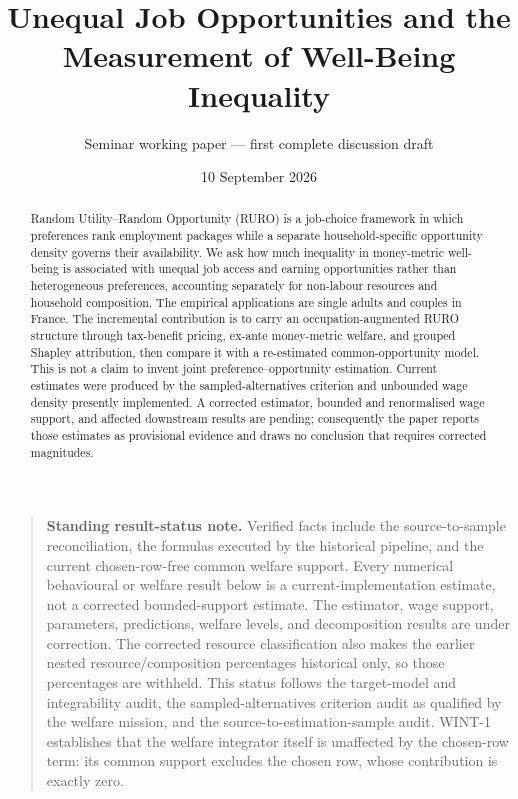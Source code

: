 \documentclass[11pt,a4paper]{article}
\title{Unequal Job Opportunities and the Measurement of Well-Being Inequality}
\author{Seminar working paper --- first complete discussion draft}
\date{10 September 2026}
\begin{document}
\maketitle

\begin{abstract}
Random Utility--Random Opportunity (RURO) is a job-choice framework in which
preferences rank employment packages while a separate household-specific
opportunity density governs their availability. We ask how much inequality in
money-metric well-being is associated with unequal job access and earning
opportunities rather than heterogeneous preferences, accounting separately for
non-labour resources and household composition. The empirical applications are
single adults and couples in France. The incremental contribution is to carry an
occupation-augmented RURO structure through tax-benefit pricing, ex-ante
money-metric welfare, and grouped Shapley attribution, then compare it with a
re-estimated common-opportunity model. This is not a claim to invent joint
preference--opportunity estimation. Current estimates were produced by the
sampled-alternatives criterion and unbounded wage density presently implemented.
A corrected estimator, bounded and renormalised wage support, and affected
downstream results are pending; consequently the paper reports those estimates
as provisional evidence and draws no conclusion that requires corrected
magnitudes.
\end{abstract}

\begin{quote}
\textbf{Standing result-status note.}
Verified facts include the source-to-sample reconciliation, the formulas
executed by the historical pipeline, and the current chosen-row-free common
welfare support. Every numerical behavioural or welfare result below is a
current-implementation estimate, not a corrected bounded-support estimate. The
estimator, wage support, parameters, predictions, welfare levels, and
decomposition results are under correction. The corrected resource
classification also makes the earlier nested resource/composition percentages
historical only, so those percentages are withheld. This status follows the
target-model and integrability audit, the sampled-alternatives criterion audit
as qualified by the welfare mission, and the source-to-estimation-sample audit.
WINT-1 establishes that the welfare integrator itself is unaffected by the
chosen-row term: its common support excludes the chosen row, whose contribution
is exactly zero.
\end{quote}
\end{document}

